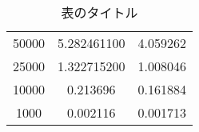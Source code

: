 \documentclass[a4j]{jarticle} %
\begin{document}
\begin{table}[h]
    \centering
    \caption{表のタイトル}
    \label{tab:hogehoge}
    \begin{tabular}{|c|c|c|}
        \hline  
        50000 & 5.282461100 & 4.059262 \\
  25000 & 1.322715200 & 1.008046 \\
  10000 & 0.213696 & 0.161884 \\
  1000 & 0.002116 & 0.001713 \\
    \end{tabular}
\end{table}
\end{document}
